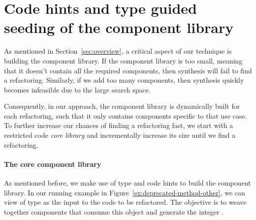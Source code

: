 \documentclass[sigconf,review,anonymous]{acmart}
\begin{document}

\section{{\bf Code hints and type guided seeding of the component library}}\label{sec:components-seeding}
As mentioned in Section~\ref{sec:overview}, a critical aspect of our technique is building the
component library. 
If the component library is too small, meaning that it doesn't contain all
the required components, then synthesis will fail to find a refactoring.
Similarly, if we add too many components, then synthesis quickly becomes infeasible
due to the large search space.

Consequently, in our approach, the component library is dynamically built for each refactoring,
such that it only contains components specific to that use case.
To further increase our chances of finding a refactoring fast, we start with a restricted code  {\em core library} and incrementally increase its size until we find a refactoring.


\paragraph{The core component library}
As mentioned before, we make use of type and code hints to build the component library.
In our running example in Figure~\ref{ex:deprecated-method-other}, we can view  of type  as the input to the code to be refactored. The objective is to weave together components that consume this object and generate the integer .
\end{document}
